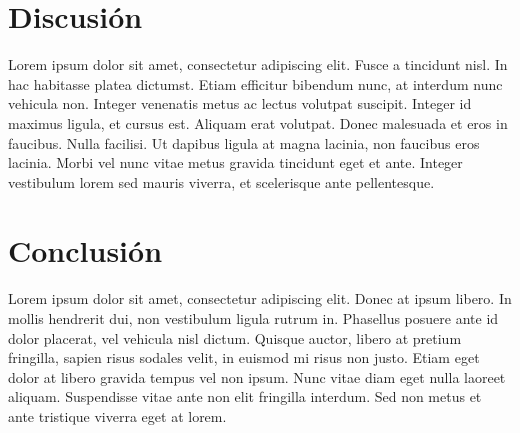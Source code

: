 \documentclass[conference]{IEEEtran}
\begin{document}
\section{Discusión}
Lorem ipsum dolor sit amet, consectetur adipiscing elit. Fusce a tincidunt nisl. In hac habitasse platea dictumst. Etiam efficitur bibendum nunc, at interdum nunc vehicula non. Integer venenatis metus ac lectus volutpat suscipit. Integer id maximus ligula, et cursus est. Aliquam erat volutpat. Donec malesuada et eros in faucibus. Nulla facilisi. Ut dapibus ligula at magna lacinia, non faucibus eros lacinia. Morbi vel nunc vitae metus gravida tincidunt eget et ante. Integer vestibulum lorem sed mauris viverra, et scelerisque ante pellentesque.

\section{Conclusión}
Lorem ipsum dolor sit amet, consectetur adipiscing elit. Donec at ipsum libero. In mollis hendrerit dui, non vestibulum ligula rutrum in. Phasellus posuere ante id dolor placerat, vel vehicula nisl dictum. Quisque auctor, libero at pretium fringilla, sapien risus sodales velit, in euismod mi risus non justo. Etiam eget dolor at libero gravida tempus vel non ipsum. Nunc vitae diam eget nulla laoreet aliquam. Suspendisse vitae ante non elit fringilla interdum. Sed non metus et ante tristique viverra eget at lorem.
\end{document}
